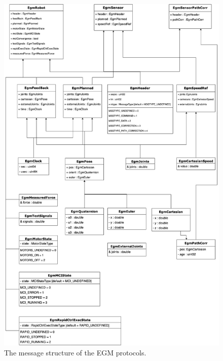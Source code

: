 \documentclass{cslthse-msc}
\begin{document}
\begin{figure}[H]
    \centering
    \includegraphics[width=12cm]{egm_proto_v2.jpg}
    \caption{The message structure of the EGM protocols.}
    \label{fig:egm_proto}
\end{figure}
\end{document}
